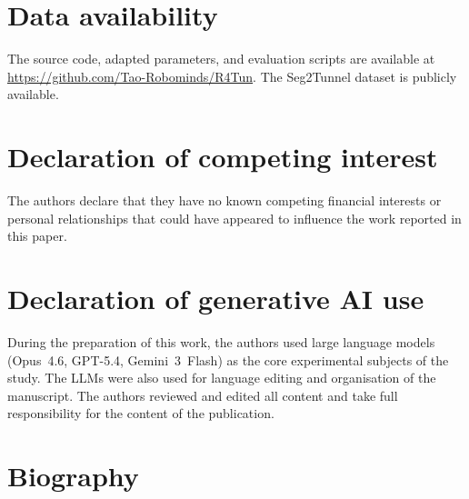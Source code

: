 \documentclass[a4paper,fleqn]{cas-dc}
\begin{document}
\section*{Data availability}

The source code, adapted parameters, and evaluation scripts are available at \url{https://github.com/Tao-Robominds/R4Tun}. The Seg2Tunnel dataset is publicly available.

\section*{Declaration of competing interest}

The authors declare that they have no known competing financial interests or personal relationships that could have appeared to influence the work reported in this paper.

\section*{Declaration of generative AI use}

During the preparation of this work, the authors used large language models (Opus~4.6, GPT-5.4, Gemini~3~Flash) as the core experimental subjects of the study. The LLMs were also used for language editing and organisation of the manuscript. The authors reviewed and edited all content and take full responsibility for the content of the publication.






\clearpage %
\section*{Biography}



\end{document}
